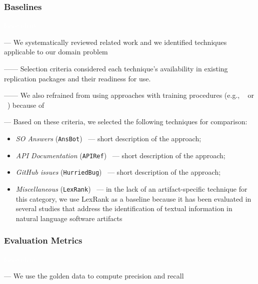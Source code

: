 \subsubsection{Baselines}
\label{cp4:comparison-techniques}
\textcolor{white}{force ident} %

--- We systematically reviewed related work and we identified techniques applicable to our domain problem

------ Selection criteria considered each technique's availability in existing replication packages and their readiness for use.

------ We also refrained from using approaches with training procedures (e.g., ~\cite{liu2020} or ~\cite{Treude2016}) because of ~\cite{Chaparro2017, fucci2019} \vspace{3mm}


--- Based on these criteria, we selected the following techniques for comparison:


\begin{itemize}[leftmargin=\parindent, font=\normalfont\itshape]
    \item \textit{SO Answers} (\texttt{AnsBot})~\cite{Xu2017} --- short description of the approach;
    
    \item \textit{API Documentation} (\texttt{APIRef})~\cite{Robillard2015} --- short description of the approach;
    
    \item \textit{GitHub issues} (\texttt{HurriedBug})~\cite{Lotufo2012} --- short description of the approach;

    \item \textit{Miscellaneous} (\texttt{LexRank})~\cite{Erkan2004} --- in the lack of an artifact-specific technique for this category, we use LexRank as a baseline because it has been evaluated in several studies that address the identification of textual information in natural language software artifacts~\cite{nadi2020, Ponzanelli2017}
\end{itemize}






\subsubsection{Evaluation Metrics}
\textcolor{white}{force ident} %

--- We use the golden data to compute precision and recall



